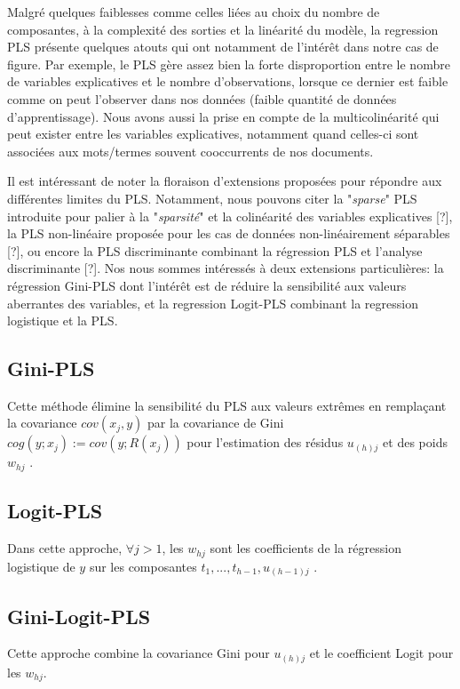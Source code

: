 Malgré quelques faiblesses comme celles liées au choix du nombre de composantes, à la complexité des sorties et la linéarité du modèle, la regression PLS présente quelques atouts qui ont notamment de l'intérêt dans notre cas de figure. Par exemple, le PLS gère assez bien la forte disproportion entre le nombre de variables explicatives et le nombre d'observations, lorsque ce dernier est faible comme on peut l'observer dans nos données (faible quantité de données d'apprentissage). Nous avons aussi la prise en compte de la multicolinéarité qui peut exister entre les variables explicatives, notamment quand celles-ci sont associées aux mots/termes souvent cooccurrents de nos documents.

Il est intéressant de noter la floraison d'extensions proposées pour répondre aux différentes limites du PLS. Notamment, nous pouvons citer la "\textit{sparse}" PLS introduite pour palier à la "\textit{sparsité}" et la colinéarité des variables explicatives [?], la PLS non-linéaire proposée pour les cas de données non-linéairement séparables [?], ou encore la PLS discriminante combinant la régression PLS et l'analyse discriminante [?]. Nos nous sommes intéressés à deux extensions particulières: la régression Gini-PLS \citep{mussard2018ginipls} dont l'intérêt est de réduire la sensibilité aux valeurs aberrantes des variables, et la regression Logit-PLS \citep{tenenhaus2005logitpls}  combinant la regression logistique et la PLS.
\subsection{Gini-PLS}
Cette méthode élimine la sensibilité du PLS aux valeurs extrêmes en remplaçant la covariance $cov(x_j, y)$ par la covariance de Gini $cog(y; x_j) := cov(y; R(x_j))$ pour l'estimation des résidus $u_{(h)j}$ et des poids $w_{hj}$ \citep{mussard2018ginipls}.


\subsection{Logit-PLS}
Dans cette approche, $\forall j > 1$, les $w_{hj} $ sont les coefficients de la régression logistique de $y$ sur les composantes $t_1, ..., t_{h-1}, u_{(h-1)j}$ \cite{tenenhaus2005logitpls}.

\subsection{Gini-Logit-PLS}
Cette approche combine la covariance Gini pour $u_{(h)j}$ et le coefficient Logit pour les $w_{hj}$.



